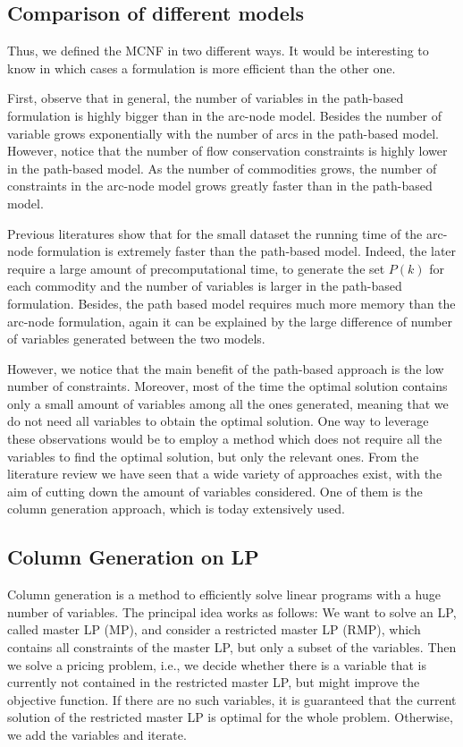 \subsection{Comparison of different models}
Thus, we defined the MCNF in two different ways. It would be interesting to know
in which cases a formulation is more efficient than the other one.

First, observe
that in general, the number of variables in
the path-based formulation is highly bigger than in the arc-node model. Besides the
number of variable grows exponentially with the number of arcs in the path-based
model. However, notice that the number of flow conservation constraints is highly lower in the path-based model. As the number of
commodities grows, the number of constraints in the arc-node model grows greatly
faster than in the path-based model.

Previous literatures show that for the small dataset the running time of the arc-node formulation is extremely
faster than the path-based model. Indeed, the later require a large amount of precomputational
time, to generate the set $P(k)$ for each commodity and the number of
variables is larger in the path-based formulation. Besides, the path based model requires
much more memory than the arc-node formulation, again it can be explained
by the large difference of number of variables generated between the two models.

However, we notice that the main benefit of the path-based approach
is the low number of constraints. Moreover, most of the time the optimal
solution contains only a small amount of variables among all the ones generated,
meaning that we do not need all variables to obtain the optimal solution. One way
to leverage these observations would be to employ a method which does not require
all the variables to find the optimal solution, but only the relevant ones. From the
literature review we have seen that a wide variety of approaches exist, with the aim
of cutting down the amount of variables considered. One of them is the column
generation approach, which is today extensively used.

\subsection{Column Generation on LP}

Column generation is a method to efficiently solve linear programs with a
huge number of variables. The
principal idea works as follows: We want to
solve an LP, called master LP (MP), and consider a restricted master LP (RMP), which
contains all constraints of the master LP, but only a subset of the variables.
Then we solve a pricing problem, i.e., we decide whether there is a variable
that is currently not contained in the restricted master LP, but might improve
the objective function. If there are no such variables, it is guaranteed that
the current solution of the restricted master LP is optimal for the whole
problem. Otherwise, we add the variables and iterate.

